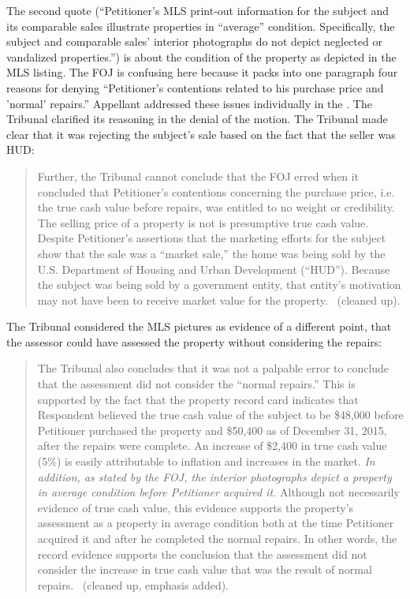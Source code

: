 \documentclass[12pt,\documentclassflag]{michiganCourtOfAppealsBrief}
\begin{document}
The second quote (``Petitioner's MLS print-out information for the subject and its comparable sales illustrate properties in ``average'' condition.
Specifically, the subject and comparable sales' interior photographs
do not depict neglected or vandalized properties.'') is about the condition of the property as depicted in the MLS listing.
The FOJ is confusing here because it packs into one paragraph four reasons for denying ``Petitioner's contentions related to his purchase price and 'normal' repairs.'' Appellant addressed these issues individually in the \motionForReconsideration[4-5]. The Tribunal clarified its reasoning in the denial of the motion. The Tribunal made clear that it was rejecting the subject's sale based on the fact that the seller was HUD:

\begin{quote}
Further, the Tribunal cannot conclude that the FOJ erred when it
concluded that Petitioner's contentions concerning the purchase price, i.e. the true cash value before repairs, was entitled to no weight or credibility. The selling price of a property is not is presumptive true cash value. Despite Petitioner's assertions that the marketing efforts for the subject show that the sale was a ``market sale,'' the home was
being sold by the U.S. Department of Housing and Urban Development (``HUD''). Because the subject was being sold by a government entity, that entity's motivation may not have been to receive market value for the property. \reconsiderationDenied[2]\ (cleaned up).
\end{quote}

The Tribunal considered the MLS pictures as evidence of a different point, that the assessor could have assessed the property without considering the repairs:

\begin{quote}
  The Tribunal also concludes that it was not a palpable error to conclude that the assessment did not consider the ``normal repairs.'' This is supported by the fact that the property record card indicates that Respondent believed the true cash value of the subject to be \$48,000 before Petitioner purchased the property and \$50,400 as of December 31, 2015, after the repairs were complete. An increase of \$2,400 in true cash value (5\%) is easily attributable to inflation and increases in the market. {\em In addition, as stated by the FOJ, the interior photographs depict a property in average condition before Petitioner acquired it.} Although not necessarily evidence of true cash value, this evidence supports the property's assessment as a property in average condition both at the time Petitioner acquired it and after he completed the normal repairs. In other words, the record evidence supports the conclusion that the assessment did not consider the increase in true cash value that was the result of normal repairs. \reconsiderationDenied[2]\ (cleaned up, emphasis added).
\end{quote}
\end{document}
